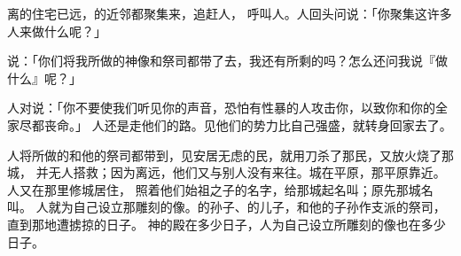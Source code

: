 {离{}的住宅已远，{}的近邻都聚集来，追赶{}人，
呼叫{}人。{}人回头问{}说：「你聚集这许多人来做什么呢？」
\par }{\PP {}说：「你们将我所做的神像和祭司都带了去，我还有所剩的吗？怎么还问我说『做什么』呢？」
\par }{\PP {}人对{}说：「你不要使我们听见你的声音，恐怕有性暴的人攻击你，以致你和你的全家尽都丧命。」
人还是走他们的路。{}见他们的势力比自己强盛，就转身回家去了。
\par }{\PP {}人将{}所做的{}和他的祭司都带到{}，见安居无虑的民，就用刀杀了那民，又放火烧了那城，
并无人搭救；因为离{}远，他们又与别人没有来往。城在平原，那平原靠近{}。{}人又在那里修城居住，
照着他们始祖{}之子{}的名字，给那城起名叫{}；原先那城名叫{}。
人就为自己设立那雕刻的像。{}的孙子、{}的儿子{}，和他的子孙作{}支派的祭司，直到那地遭掳掠的日子。
神的殿在{}多少日子，{}人为自己设立{}所雕刻的像也在{}多少日子。

}

